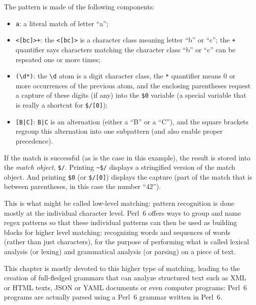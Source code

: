 The pattern is made of the following components:
\begin{itemize}

\item \verb'a': a literal match of letter ``a'';

\item \verb'<[bc]>+': the \verb'<[bc]>' is a character class 
meaning letter ``b'' or ``c''; the \verb'+' quantifier 
says characters matching the character class ``b'' or ``c'' 
can be repeated one or more times;

\item \verb'(\d*)': the \verb'\d' atom is a digit character 
class, the \verb'*' quantifier means 0 or more occurrences 
of the previous atom, and the enclosing parentheses request 
a capture of these digits (if any) into the \verb'$0' 
variable (a special variable that is really a shortcut 
for \verb'$/[0]');

\item \verb'[B|C]': \verb'B|C' is an alternation (either 
a ``B'' or a ``C''), and the square brackets regroup this 
alternation into one subpattern (and also enable proper 
precedence).

\end{itemize}

If the match is successful (as is the case in this example), 
the result is stored into the \emph{match object}, \verb'$/'.
Printing \verb'~$/' displays a stringified version of the 
match object. And printing \verb'$0' (or \verb'$/[0]') 
displays the capture (part of the match that is between 
parentheses, in this case the number ``42'').

This is what might be called low-level matching: pattern 
recognition is done mostly at the individual character level.
Perl~6 offers ways to group and name regex patterns so that 
these individual patterns can then be used as building 
blocks for higher level matching: recognizing words and 
sequences of words (rather than just characters), for the 
purpose of performing what is called lexical analysis 
(or lexing) and grammatical analysis (or parsing) on a piece 
of text. 

This chapter is mostly devoted to this higher type 
of matching, leading to the creation of full-fledged grammars 
that can analyze structured text such as XML or HTML texts, 
JSON or YAML documents or even computer programs: Perl~6 
programs are actually parsed using a Perl~6 grammar written 
in Perl~6.

